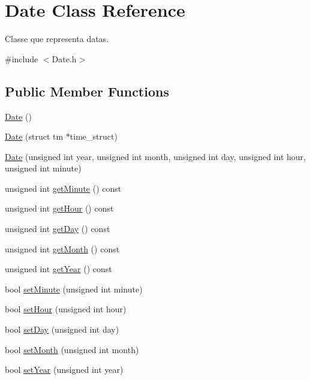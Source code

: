 \hypertarget{class_date}{\section{Date Class Reference}
\label{class_date}
}


Classe que representa datas.  




{\ttfamily \#include $<$Date.\+h$>$}

\subsection*{Public Member Functions}
\begin{DoxyCompactItemize}
\item 
\hyperlink{class_date_a4e59ed4ba66eec61c27460c5d09fa1bd}{Date} ()
\item 
\hyperlink{class_date_ac4860b7b498e1f4142c1d3cde0195fdc}{Date} (struct tm $\ast$time\+\_\+struct)
\item 
\hyperlink{class_date_a8aff6457db8347405876084c651e4361}{Date} (unsigned int year, unsigned int month, unsigned int day, unsigned int hour, unsigned int minute)
\item 
unsigned int \hyperlink{class_date_ac770a597c5db01c15f5909d30ecc614d}{get\+Minute} () const 
\item 
unsigned int \hyperlink{class_date_a7ec01c802e7fa66d0a3d301f14541de4}{get\+Hour} () const 
\item 
unsigned int \hyperlink{class_date_a254204c492d3ebc26a2c62d532e34844}{get\+Day} () const 
\item 
unsigned int \hyperlink{class_date_ac471b901531b7a1e73809918bac8c1ec}{get\+Month} () const 
\item 
unsigned int \hyperlink{class_date_a6561cf495bd6b7e6c747420d7ae9cc12}{get\+Year} () const 
\item 
bool \hyperlink{class_date_a714d7a4b5af1ab06b4f99b90f2ffe589}{set\+Minute} (unsigned int minute)
\item 
bool \hyperlink{class_date_a45df391c8b5da977bd4662b81c0cd839}{set\+Hour} (unsigned int hour)
\item 
bool \hyperlink{class_date_aff23cb89959285d5743471cfb8de79be}{set\+Day} (unsigned int day)
\item 
bool \hyperlink{class_date_a317a64663663c32417496549da4b52ef}{set\+Month} (unsigned int month)
\item 
bool \hyperlink{class_date_aae265e5db481eaae2859cbfb2b2d4b1f}{set\+Year} (unsigned int year)

\end{DoxyCompactItemize}
